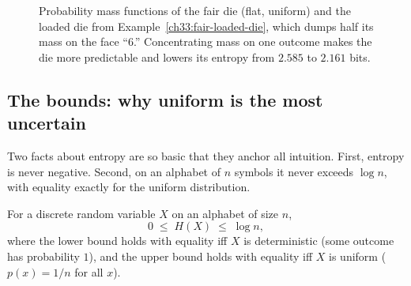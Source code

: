 \begin{figure}[H]
\centering
{}
\caption{Probability mass functions of the fair die (flat, uniform) and the loaded die from
Example~\ref{ch33:fair-loaded-die}, which dumps half its mass on the face ``$6$.'' Concentrating mass on
one outcome makes the die more predictable and lowers its entropy from $2.585$ to $2.161$ bits.}
\label{ch33:fig-die-pmf}
\end{figure}

\subsection{The bounds: why uniform is the most uncertain}

Two facts about entropy are so basic that they anchor all intuition. First, entropy is never negative.
Second, on an alphabet of $n$ symbols it never exceeds $\log n$, with equality exactly for the uniform
distribution.

\begin{theorem}
\label{ch33:entropy-bounds}
For a discrete random variable $X$ on an alphabet of size $n$,
\[
  0 \;\le\; H(X) \;\le\; \log n,
\]
where the lower bound holds with equality iff $X$ is deterministic (some outcome has probability $1$), and
the upper bound holds with equality iff $X$ is uniform ($p(x) = 1/n$ for all $x$).
\end{theorem}

